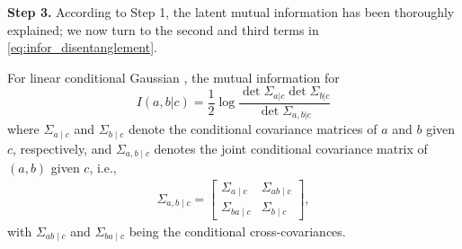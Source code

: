 \documentclass{article} %
\begin{document}
\begin{proofwithframe}
\textbf{Step 3.} According to Step 1, the latent mutual information has been thoroughly explained; we now turn to the second and third terms in \eqref{eq:infor_disentanglement}.

For linear conditional Gaussian \citep{lubbe1997information}, the mutual information for 
\begin{equation}
    \label{eq:closed_form_gaussian}
I(a, b| c) = \frac{1}{2} \log \frac{\det \Sigma_{a|c} \det \Sigma_{b|c}}{\det \Sigma_{a,b|c}}
\end{equation}
where $\Sigma_{a \mid c}$ and $\Sigma_{b \mid c}$ denote the conditional covariance matrices of $a$ and $b$ given $c$, respectively, and $\Sigma_{a,b \mid c}$ denotes the joint conditional covariance matrix of $(a,b)$ given $c$, i.e.,
\begin{align*}
        \Sigma_{a,b \mid c} =
\begin{bmatrix} 
\Sigma_{a \mid c} & \Sigma_{ab \mid c} \\
\Sigma_{ba \mid c} & \Sigma_{b \mid c}
\end{bmatrix},
\end{align*}
with $\Sigma_{ab \mid c}$ and $\Sigma_{ba \mid c}$ being the conditional cross-covariances.



\end{proofwithframe}
\end{document}
